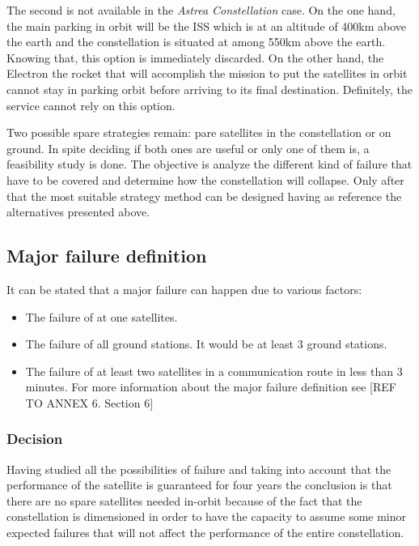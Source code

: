 The second is not available in the \textit{Astrea Constellation} case. On the one hand, the main parking in orbit will be the ISS which is at an altitude of 400km above the earth and the constellation is situated at among 550km above the earth. Knowing that, this option is immediately discarded. On the other hand, the Electron the rocket that will accomplish the mission to put the satellites in orbit cannot stay in parking orbit before arriving to its final destination. Definitely, the service cannot rely on this option.

Two possible spare strategies remain: pare satellites in the constellation or on ground. In spite deciding if both ones are useful or only one of them is, a feasibility study is done. The objective is analyze the different kind of failure that have to be covered and determine how the constellation will collapse. Only after that the most suitable strategy method can be designed having as reference the alternatives presented above. 

\subsection{Major failure definition}
It can be stated that a major failure can happen due to various factors:
\begin{itemize}
\item The failure of at one satellites.
\item The failure of all ground stations. It would be at least 3 ground stations.
\item The failure of at least two satellites in a communication route in less than 3 minutes.
\newline\newline
For more information about the major failure definition see [{REF TO ANNEX 6. Section 6}]
\end{itemize}

\subsubsection{Decision}
Having studied all the possibilities of failure and taking into account that the performance of the satellite is guaranteed for four years the conclusion is that there are no spare satellites needed in-orbit because of the fact that the constellation is dimensioned in order to have the capacity to assume some minor expected failures that will not affect the performance of the entire constellation.

